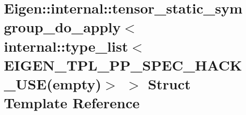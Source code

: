 \hypertarget{struct_eigen_1_1internal_1_1tensor__static__symgroup__do__apply_3_01internal_1_1type__list_3_01_c8ec19381230c5f4f1bbf94f4e53c0f0}{}\section{Eigen\+:\+:internal\+:\+:tensor\+\_\+static\+\_\+symgroup\+\_\+do\+\_\+apply$<$ internal\+:\+:type\+\_\+list$<$ E\+I\+G\+E\+N\+\_\+\+T\+P\+L\+\_\+\+P\+P\+\_\+\+S\+P\+E\+C\+\_\+\+H\+A\+C\+K\+\_\+\+U\+SE(empty)$>$ $>$ Struct Template Reference}
\label{struct_eigen_1_1internal_1_1tensor__static__symgroup__do__apply_3_01internal_1_1type__list_3_01_c8ec19381230c5f4f1bbf94f4e53c0f0}
